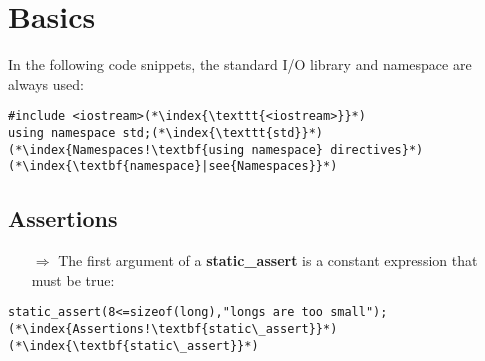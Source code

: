 \documentclass[10pt]{book}
\begin{document}
\chapter{Basics}
\noindent
In the following code snippets, the standard I/O library and namespace are always used:
\begin{lstlisting}
#include <iostream>(*\index{\texttt{<iostream>}}*)
using namespace std;(*\index{\texttt{std}}*)(*\index{Namespaces!\textbf{using namespace} directives}*)(*\index{\textbf{namespace}|see{Namespaces}}*)
\end{lstlisting}
%
%
\section{Assertions}
\begin{enumerate}
\item[$\Rightarrow$] The first argument of a \textbf{static\_assert} is a constant expression that must be true:
\end{enumerate}
\begin{lstlisting}
static_assert(8<=sizeof(long),"longs are too small");(*\index{Assertions!\textbf{static\_assert}}*)(*\index{\textbf{static\_assert}}*)
\end{lstlisting}
%
%
\end{document}
